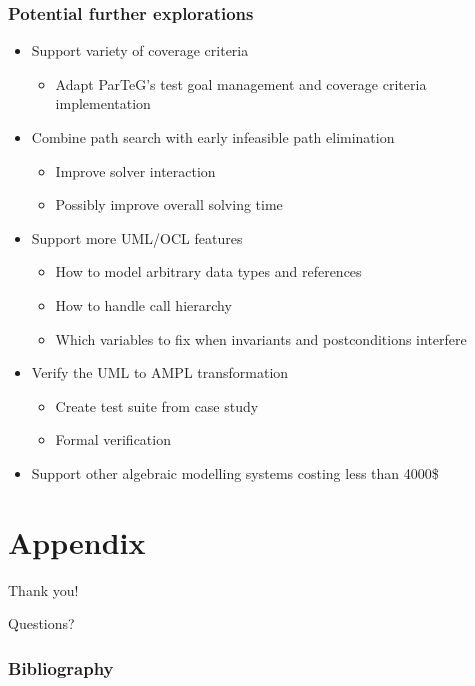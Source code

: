 \documentclass{beamer}
\begin{document}
\begin{frame}
\frametitle{Potential further explorations}
\begin{itemize}
\item Support variety of coverage criteria
\begin{itemize}
\item Adapt ParTeG's test goal management and coverage criteria implementation
\end{itemize}
\item Combine path search with early infeasible path elimination
\begin{itemize}
\item Improve solver interaction
\item Possibly improve overall solving time
\end{itemize}
\item Support more UML/OCL features
\begin{itemize}
\item How to model arbitrary data types and references
\item How to handle call hierarchy
\item Which variables to fix when invariants and postconditions interfere
\end{itemize}
\item Verify the UML to AMPL transformation
\begin{itemize}
\item Create test suite from case study 
\item Formal verification
\end{itemize}
\item Support other algebraic modelling systems costing less than 4000\$ 
\end{itemize}
\end{frame}

\section*{Appendix}
\begin{frame}
\begin{block}{Thank you!}
\begin{center}
\Huge{Questions?}
\end{center}
\end{block}
\end{frame}

\frametitle{Bibliography}

%

\end{document}
